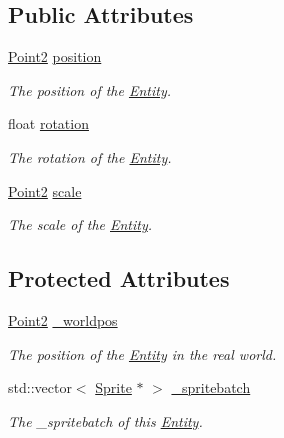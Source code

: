 \subsection*{Public Attributes}
\begin{DoxyCompactItemize}
\item 
\mbox{\label{class_entity_af423990bd8393e6cbec1acf1c0b397ce}} 
\hyperlink{pointx_8h_aca903a92c8ced8823fea9fac7e23677a}{Point2} \hyperlink{class_entity_af423990bd8393e6cbec1acf1c0b397ce}{position}
\begin{DoxyCompactList}\small\item\em The position of the \hyperlink{class_entity}{Entity}. \end{DoxyCompactList}\item 
\mbox{\label{class_entity_aa384ccfdaba36b1ff5f5db51ec3cdcb1}} 
float \hyperlink{class_entity_aa384ccfdaba36b1ff5f5db51ec3cdcb1}{rotation}
\begin{DoxyCompactList}\small\item\em The rotation of the \hyperlink{class_entity}{Entity}. \end{DoxyCompactList}\item 
\mbox{\label{class_entity_a286b63dabacf915914be06dfd37c0219}} 
\hyperlink{pointx_8h_aca903a92c8ced8823fea9fac7e23677a}{Point2} \hyperlink{class_entity_a286b63dabacf915914be06dfd37c0219}{scale}
\begin{DoxyCompactList}\small\item\em The scale of the \hyperlink{class_entity}{Entity}. \end{DoxyCompactList}\end{DoxyCompactItemize}
\subsection*{Protected Attributes}
\begin{DoxyCompactItemize}
\item 
\mbox{\label{class_entity_aa8297d9903ba65954f51e400da52c3a9}} 
\hyperlink{pointx_8h_aca903a92c8ced8823fea9fac7e23677a}{Point2} \hyperlink{class_entity_aa8297d9903ba65954f51e400da52c3a9}{\+\_\+worldpos}
\begin{DoxyCompactList}\small\item\em The position of the \hyperlink{class_entity}{Entity} in the real world. \end{DoxyCompactList}\item 
\mbox{\label{class_entity_a3927fd7358c34de5e2783bdf912cb9ed}} 
std\+::vector$<$ \hyperlink{class_sprite}{Sprite} $\ast$ $>$ \hyperlink{class_entity_a3927fd7358c34de5e2783bdf912cb9ed}{\+\_\+spritebatch}
\begin{DoxyCompactList}\small\item\em The \+\_\+spritebatch of this \hyperlink{class_entity}{Entity}. \end{DoxyCompactList}\end{DoxyCompactItemize}
